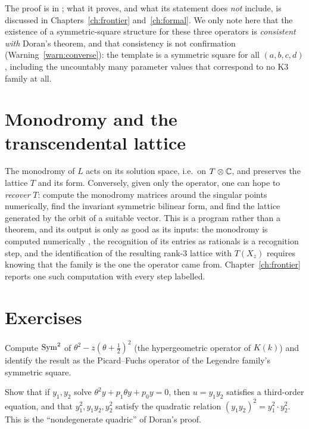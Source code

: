 The proof is in ; what it
proves, and what its statement does \emph{not} include, is discussed in
Chapters~\ref{ch:frontier} and~\ref{ch:formal}. We only note here that the
existence of a symmetric-square structure for these three operators is
\emph{consistent with} Doran's theorem, and that consistency is not
confirmation (Warning~\ref{warn:converse}): the template is a symmetric square
for all $(a,b,c,d)$, including the uncountably many parameter values that
correspond to no K3 family at all.

\section{Monodromy and the transcendental lattice}

The monodromy of $L$ acts on its solution space, i.e.\ on $T\otimes\mathbb{C}$, and
preserves the lattice $T$ and its form. Conversely, given only the operator,
one can hope to \emph{recover} $T$: compute the monodromy matrices around the
singular points numerically, find the invariant symmetric bilinear form, and
find the lattice generated by the orbit of a suitable vector. This is a
program rather than a theorem, and its output is only as good as its inputs:
the monodromy is computed numerically \Nstatus, the recognition of its
entries as rationals is a recognition step, and the identification of the
resulting rank-3 lattice with $T(X_z)$ requires knowing that the family is the
one the operator came from. Chapter~\ref{ch:frontier} reports one such
computation with every step labelled.

\section{Exercises}

\begin{exercise}
Compute $\operatorname{Sym}^2$ of $\theta^2-z(\theta+\tfrac12)^2$ (the hypergeometric
operator of $K(k)$) and identify the result as the Picard--Fuchs operator of
the Legendre family's symmetric square.
\end{exercise}

\begin{exercise}[$\star$]
Show that if $y_1,y_2$ solve $\theta^2y+p_1\theta y+p_0y=0$, then
$u=y_1y_2$ satisfies a third-order equation, and that $y_1^2,y_1y_2,y_2^2$
satisfy the quadratic relation $(y_1y_2)^2=y_1^2\cdot y_2^2$. This is the
``nondegenerate quadric'' of Doran's proof.
\end{exercise}


